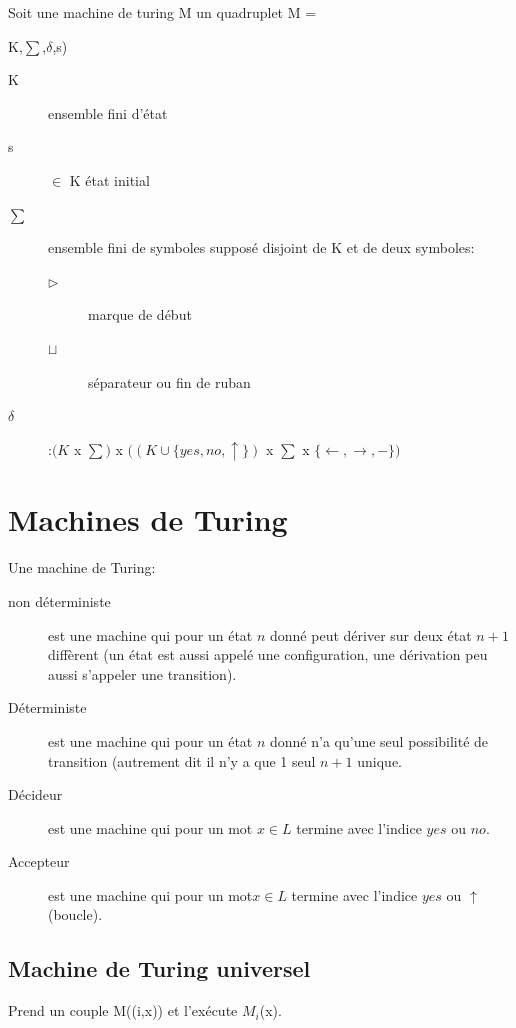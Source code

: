 Soit une machine de turing M un quadruplet M = {K,$\sum$,$\delta$,s)
\begin{description}
\item [K] ensemble fini d'état 
\item [s] $\in$ K état initial
\item [$\sum$] ensemble fini de symboles supposé disjoint de K et de deux symboles:
\begin{description}
\item [$\triangleright$] marque de début
\item [$\sqcup$] séparateur ou fin de ruban
\end{description}
\item [$\delta$]:$(K$ x $\sum)$ x $((K\cup\{yes,no,\uparrow \})$ x $\sum $ x $\{\leftarrow,\rightarrow,-\})$
\end{description}
\pagebreak
\section{Machines de Turing}
Une machine de Turing:
\begin{description}
\item[non déterministe] est une machine qui pour un état $n$ donné peut dériver sur deux état $n+1$ diffèrent (un état est aussi appelé une configuration, une dérivation peu aussi s'appeler une transition).
\item[Déterministe] est une machine qui pour un état $n$ donné n'a qu'une seul possibilité de transition (autrement dit il n'y a que 1 seul $n+1$ unique.
\item[Décideur] est une machine qui pour un mot $x \in L$ termine avec l'indice $yes$ ou $no$.
\item[Accepteur] est une machine qui pour un mot$x \in L$ termine avec l'indice $yes$ ou $\uparrow$ (boucle).
\end{description}

\subsection{Machine de Turing universel}
Prend un couple M((i,x)) et l'exécute $M_i$(x).

}
